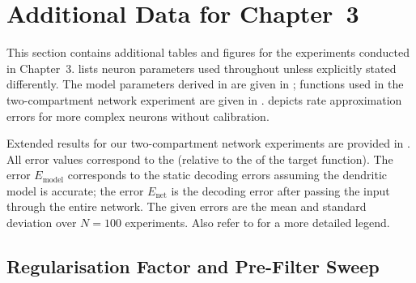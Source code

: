 
\section{Additional Data for Chapter~3}
\label{app:data_chp3}

This section contains additional tables and figures for the experiments conducted in Chapter~3.
 lists neuron parameters used throughout  unless explicitly stated differently.
The model parameters derived in  are given in ; functions used in the two-compartment \LIF network experiment are given in .
 depicts rate approximation errors for more complex \nlif neurons without calibration.







Extended results for our two-compartment \LIF network experiments are provided in .
All error values correspond to the \NRMSE (relative to the \RMS of the target function).
The error $E_\mathrm{model}$ corresponds to the static decoding errors assuming the dendritic model is accurate;
the error $E_\mathrm{net}$ is the decoding error after passing the input through the entire network.
The given errors are the mean and standard deviation over $N = 100$ experiments.
Also refer to  for a more detailed legend.



\subsection{Regularisation Factor and Pre-Filter Sweep}
\label{app:two_comp_regularisation_factor_sweep}

